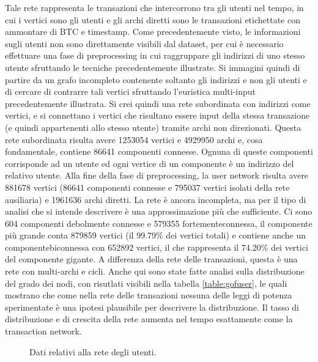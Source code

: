 Tale rete rappresenta le transazioni che intercorrono tra gli utenti nel tempo, in cui i vertici sono gli utenti e gli archi diretti sono le transazioni etichettate con ammontare di BTC e timestamp.
Come precedentemente visto, le informazioni sugli utenti non sono direttamente visibili dal dataset, per cui è necessario effettuare una fase di preprocessing in cui raggruppare gli indirizzi di uno stesso utente sfruttando le tecniche precedentemente illustrate.
Si immagini quindi di partire da un grafo incompleto contenente soltanto gli indirizzi e non gli utenti e di cercare di contrarre tali vertici sfruttando l'euristica multi-input precedentemente illustrata.
Si crei quindi una rete subordinata con indirizzi come vertici, e si connettano i vertici che risultano essere input della stessa transazione (e quindi appartenenti allo stesso utente) tramite archi non direzionati. Questa rete subordinata risulta avere 1253054 vertici e 4929950 archi e, cosa fondamentale, contiene 86641 componenti connesse. Ognuna di queste componenti corrisponde ad un utente ed ogni vertice di un componente è un indirizzo del relativo utente.
Alla fine della fase di preprocessing, la user network risulta avere 881678 vertici (86641 componenti connesse e 795037 vertici isolati della rete ausiliaria) e 1961636 archi diretti. La rete è ancora incompleta, ma per il tipo di analisi che si intende descrivere è una approssimazione più che sufficiente. Ci sono 604 componenti debolmente connesse e 579355 \gls{fortementeconnessa}, il componente più grande conta 879859 vertici (il 99.79\% dei vertici totali) e contiene anche un \gls{componentebiconnessa} con 652892 vertici, il che rappresenta il 74.20\% dei vertici del componente gigante.
A differenza della rete delle transazioni, questa è una rete con multi-archi e cicli.
Anche qui sono state fatte analisi sulla distribuzione del grado dei nodi, con risutlati visibili nella tabella \ref{table:gofuser}, le quali mostrano che come nella rete delle transazioni nessuna delle leggi di potenza sperimentate è una ipotesi plausibile per descrivere la distribuzione. Il tasso di distribuzione e di crescita della rete aumenta nel tempo esattamente come la transaction network.

\begin{figure}[htbp]
  \centering
  \hfill
  \par
  \par
  \hfill
  \hfill
  \caption{Dati relativi alla rete degli utenti.\label{anonimity_1.4}}
\end{figure}

